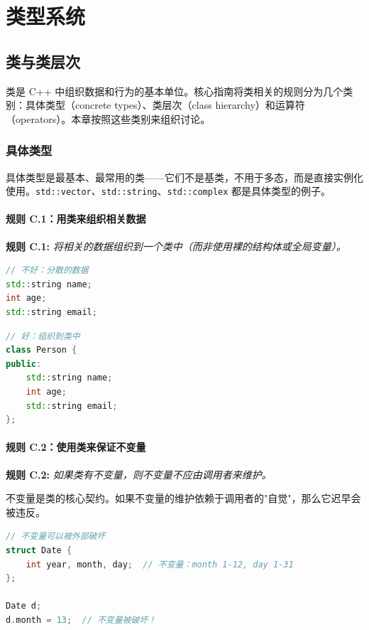 \part{类型系统}

\chapter{类与类层次}

类是 C++ 中组织数据和行为的基本单位。核心指南将类相关的规则分为几个类别：具体类型（concrete types）、类层次（class hierarchy）和运算符（operators）。本章按照这些类别来组织讨论。

\section{具体类型}

具体类型是最基本、最常用的类——它们不是基类，不用于多态，而是直接实例化使用。\texttt{std::vector}、\texttt{std::string}、\texttt{std::complex} 都是具体类型的例子。

\subsection{规则 C.1：用类来组织相关数据}

\textbf{规则 C.1:} \textit{将相关的数据组织到一个类中（而非使用裸的结构体或全局变量）。}

\begin{lstlisting}[language=C++]
// 不好：分散的数据
std::string name;
int age;
std::string email;
\end{lstlisting}

\begin{lstlisting}[language=C++]
// 好：组织到类中
class Person {
public:
    std::string name;
    int age;
    std::string email;
};
\end{lstlisting}

\subsection{规则 C.2：使用类来保证不变量}

\textbf{规则 C.2:} \textit{如果类有不变量，则不变量不应由调用者来维护。}

不变量是类的核心契约。如果不变量的维护依赖于调用者的"自觉"，那么它迟早会被违反。

\begin{lstlisting}[language=C++]
// 不变量可以被外部破坏
struct Date {
    int year, month, day;  // 不变量：month 1-12, day 1-31
};

Date d;
d.month = 13;  // 不变量被破坏！
\end{lstlisting}

